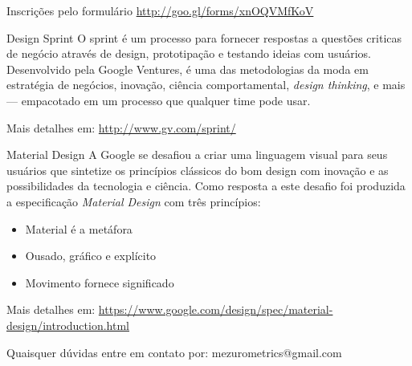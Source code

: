 \documentclass[final]{beamer} %
\begin{document}
\begin{frame}{}
\begin{block}{\large Inscrições pelo formulário}
      \url{http://goo.gl/forms/xnOQVMfKoV}
    \end{block}
    \vfill
    \begin{block}{\large Design Sprint}
      O sprint é um processo para fornecer respostas a questões criticas de negócio através de design, prototipação e testando ideias com usuários. Desenvolvido pela Google Ventures, é uma das metodologias da moda em estratégia de negócios, inovação, ciência comportamental, \textit{design thinking}, e mais — empacotado em um processo que qualquer time pode usar.

      Mais detalhes em: \url{http://www.gv.com/sprint/}
    \end{block}
    \vfill
    \begin{block}{\large Material Design}
      A Google se desafiou a criar uma linguagem visual para seus usuários que sintetize os princípios clássicos do bom design com inovação e as possibilidades da tecnologia e ciência. Como resposta a este desafio foi produzida a especificação \textit{Material Design} com três princípios:

      \begin{itemize}
        \item Material é a metáfora
        \item Ousado, gráfico e explícito
        \item Movimento fornece significado
      \end{itemize}

      Mais detalhes em: \url{https://www.google.com/design/spec/material-design/introduction.html}
    \end{block}
    \vfill
    {\large Quaisquer dúvidas entre em contato por: mezurometrics@gmail.com}
    \vfill
  \end{frame}
\end{document}
